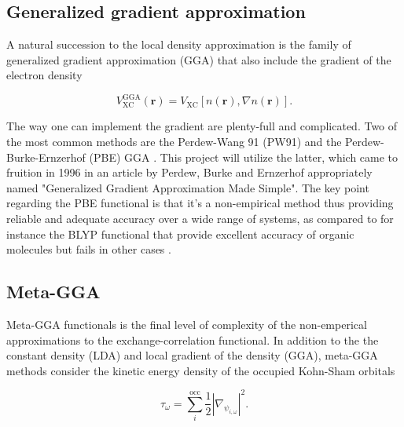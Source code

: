 \subsection{Generalized gradient approximation}
A natural succession to the local density approximation is the family of generalized gradient approximation (GGA) that also include the gradient of the electron density

\begin{equation}
V_\text{XC} ^\text{GGA} (\boldsymbol{r}) = V_\text{XC} [n(\boldsymbol{r}), \nabla n(\boldsymbol{r})].
\end{equation}

The way one can implement the gradient are plenty-full and complicated. Two of the most common methods are the Perdew-Wang 91 (PW91) \cite{pw91} and the Perdew-Burke-Ernzerhof (PBE) GGA \cite{pbe}. This project will utilize the latter, which came to fruition in  1996 in an article by Perdew, Burke and Ernzerhof appropriately named "Generalized Gradient Approximation Made Simple". The key point regarding the PBE functional is that it's a non-empirical method thus providing reliable and adequate accuracy over a wide range of systems, as compared to for instance the BLYP functional that provide excellent accuracy of organic molecules but fails in other cases \cite{PBE_forum}. 

\subsection{Meta-GGA}   
Meta-GGA functionals is the final level of  complexity of the non-emperical approximations to the exchange-correlation functional. In addition to the the constant density (LDA) and local gradient of the density (GGA), meta-GGA methods consider the kinetic energy density of the occupied Kohn-Sham orbitals \cite{metagga}
 
\begin{equation}
	\tau_\omega = \sum_i ^\text{occ}\frac{1}{2}|\nabla_{\psi_{i, \omega}}|^2.
\end{equation}

